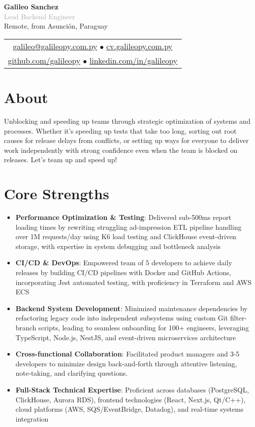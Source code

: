 \documentclass[11pt,a4paper]{article}
\newcommand{\cvheader}[5]{
  \begin{center}
    {\LARGE \textbf{#1}}\\[0.1em]
    {\large \textcolor{darkgray}{#2}}\\[0.1em]
    
    \textcolor{mediumgray}{#3}\\[0.1em]
    
    \begin{tabular}{c}
      \href{mailto:#4}{#4} $\bullet$ \href{https://#5}{#5}\\[0.1em]
      \href{https://github.com/galileopy}{github.com/galileopy} $\bullet$ 
      \href{https://www.linkedin.com/in/galileopy}{linkedin.com/in/galileopy}
    \end{tabular}
  \end{center}
}
\begin{document}
\cvheader{Galileo Sanchez}{Lead Backend Engineer}{Remote, from Asunción, Paraguay}{galileo@galileopy.com.py}{cv.galileopy.com.py}

\section{About}
Unblocking and speeding up teams through strategic optimization of systems and processes. Whether it's speeding up tests that take too long, sorting out root causes for release delays from conflicts, or setting up ways for everyone to deliver work independently with strong confidence even when the team is blocked on releases. Let's team up and speed up!

\section{Core Strengths}

\begin{itemize}
\item \textbf{Performance Optimization \& Testing}: Delivered sub-500ms report loading times by rewriting struggling ad-impression ETL pipeline handling over 1M requests/day using K6 load testing and ClickHouse event-driven storage, with expertise in system debugging and bottleneck analysis
\item \textbf{CI/CD \& DevOps}: Empowered team of 5 developers to achieve daily releases by building CI/CD pipelines with Docker and GitHub Actions, incorporating Jest automated testing, with proficiency in Terraform and AWS ECS
\item \textbf{Backend System Development}: Minimized maintenance dependencies by refactoring legacy code into independent subsystems using custom Git filter-branch scripts, leading to seamless onboarding for 100+ engineers, leveraging TypeScript, Node.js, NestJS, and event-driven microservices architecture
\item \textbf{Cross-functional Collaboration}: Facilitated product managers and 3-5 developers to minimize design back-and-forth through attentive listening, note-taking, and clarifying questions.
\item \textbf{Full-Stack Technical Expertise}: Proficient across databases (PostgreSQL, ClickHouse, Aurora RDS), frontend technologies (React, Next.js, Qt/C++), cloud platforms (AWS, SQS/EventBridge, Datadog), and real-time systems integration
\end{itemize}
\end{document}
